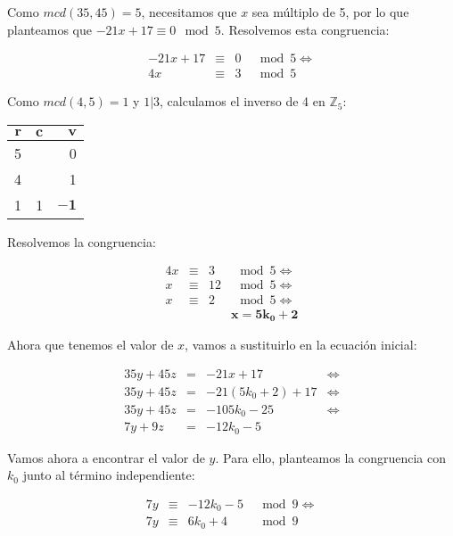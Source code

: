 Como $mcd(35,45) = 5$, necesitamos que $x$ sea múltiplo de 5, por lo que planteamos que $-21x + 17 \equiv 0 \mod 5$.
Resolvemos esta congruencia:

\[
\begin{array}{rcrl}
	-21x + 17 & \equiv & 0 & \mod 5 \iff \\
	4x        & \equiv & 3 & \mod 5
\end{array}
\]

Como $mcd(4,5) = 1$ y $1|3$, calculamos el inverso de 4 en $\mathbb{Z}_5$:

\begin{center}
\begin{tabular}{r r r}
	$\boldsymbol{r}$ & $\boldsymbol{c}$ & $\boldsymbol{v}$ \\
	\toprule
	5                &                  & 0                \\
	4                &                  & 1                \\
	1                & 1                & $\boldsymbol{-1}$
\end{tabular}
\end{center}

Resolvemos la congruencia:

\[
\begin{array}{rcrl}
	4x & \equiv & 3  & \mod 5 \iff \\
	x  & \equiv & 12 & \mod 5 \iff \\
	x  & \equiv & 2  & \mod 5 \iff \\
      &        &    & \boldsymbol{x = 5k_0 + 2}
\end{array}
\]

Ahora que tenemos el valor de $x$, vamos a sustituirlo en la ecuación inicial:

\[
\begin{array}{rcll}
	35y + 45z & = & -21x + 17          & \iff \\
	35y + 45z & = & -21(5k_0 + 2) + 17 & \iff \\
	35y + 45z & = & -105k_0 - 25       & \iff \\
	7y + 9z   & = & -12k_0 - 5         &
\end{array}
\]

Vamos ahora a encontrar el valor de $y$.
Para ello, planteamos la congruencia con $k_0$ junto al término independiente:

\[
\begin{array}{rcrl}
	7y & \equiv & -12k_0 - 5 & \mod 9 \iff \\
	7y & \equiv & 6k_0 + 4   & \mod 9
\end{array}
\]


